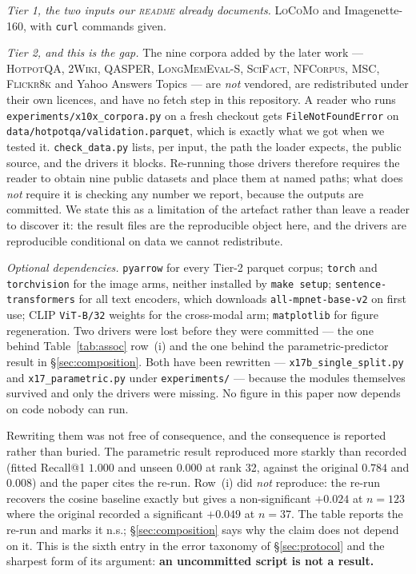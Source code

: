 \emph{Tier 1, the two inputs our \textsc{readme} already documents.} \textsc{LoCoMo} and
Imagenette-160, with \texttt{curl} commands given.

\emph{Tier 2, and this is the gap.} The nine corpora added by the later work ---
\textsc{HotpotQA}, \textsc{2Wiki}, \textsc{QASPER}, \textsc{LongMemEval-S}, \textsc{SciFact},
\textsc{NFCorpus}, \textsc{MSC}, \textsc{Flickr8k} and Yahoo Answers Topics --- are
\emph{not} vendored, are redistributed under their own licences, and have no fetch step in
this repository. A reader who runs \texttt{experiments/x10x\_corpora.py} on a fresh checkout
gets \texttt{FileNotFoundError} on \texttt{data/hotpotqa/validation.parquet}, which is
exactly what we got when we tested it. \texttt{check\_data.py} lists, per input, the path the
loader expects, the public source, and the drivers it blocks. Re-running those drivers
therefore requires the reader to obtain nine public datasets and place them at named paths;
what does \emph{not} require it is checking any number we report, because the outputs are
committed. We state this as a limitation of the artefact rather than leave a reader to
discover it: the result files are the reproducible object here, and the drivers are
reproducible conditional on data we cannot redistribute.

\emph{Optional dependencies.} \texttt{pyarrow} for every Tier-2 parquet corpus;
\texttt{torch} and \texttt{torchvision} for the image arms, neither installed by
\texttt{make setup}; \texttt{sentence-transformers} for all text encoders, which downloads
\texttt{all-mpnet-base-v2} on first use; CLIP \texttt{ViT-B/32} weights for the cross-modal
arm; \texttt{matplotlib} for figure regeneration. Two drivers were lost before they
were committed --- the one behind Table~\ref{tab:assoc} row~(i) and the one behind the
parametric-predictor result in \S\ref{sec:composition}. Both have been rewritten ---
\texttt{x17b\_single\_split.py} and \texttt{x17\_parametric.py} under
\texttt{experiments/} --- because the modules themselves survived and only the drivers
were missing. No figure in this paper now depends on code nobody can run.

Rewriting them was not free of consequence, and the consequence is reported rather than
buried. The parametric result reproduced more starkly than recorded (fitted Recall@1
$1.000$ and unseen $0.000$ at rank 32, against the original $0.784$ and $0.008$) and the
paper cites the re-run. Row~(i) did \emph{not} reproduce: the re-run recovers the cosine
baseline exactly but gives a non-significant $+0.024$ at $n{=}123$ where the original
recorded a significant $+0.049$ at $n{=}37$. The table reports the re-run and marks it
n.s.; \S\ref{sec:composition} says why the claim does not depend on it. This is the sixth
entry in the error taxonomy of \S\ref{sec:protocol} and the sharpest form of its argument:
\textbf{an uncommitted script is not a result.}
